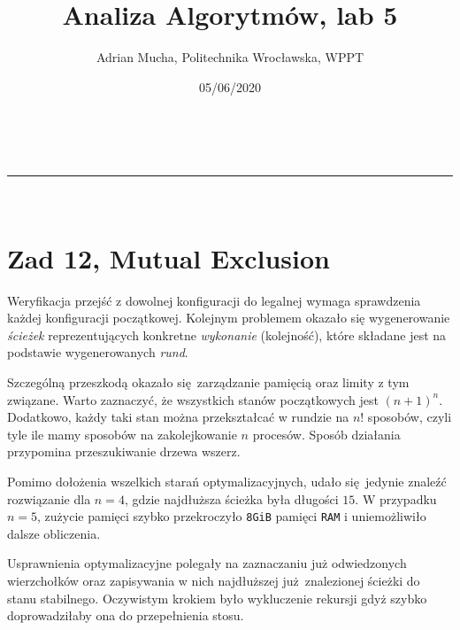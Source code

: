 \documentclass[a4paper,11pt]{article}
\makeatletter
\newcommand{\linia}{\rule{\linewidth}{0.5pt}}
\theoremstyle{mytheor}
\renewcommand{\maketitle}{
\begin{center}
\vspace{2ex}
{\huge \textsc{\@title}}
\vspace{1ex}
\\
\linia\\
\@author \hfill \@date
\vspace{4ex}
\end{center}
}
\makeatother
\begin{document}
\title{Analiza Algorytmów, lab 5}

\author{Adrian Mucha, Politechnika Wrocławska, WPPT}

\date{05/06/2020}

\maketitle

\section*{Zad 12, Mutual Exclusion}
Weryfikacja przejść z dowolnej konfiguracji do legalnej wymaga sprawdzenia każdej konfiguracji początkowej. Kolejnym problemem okazało się wygenerowanie \textit{ścieżek} reprezentujących konkretne \textit{wykonanie} (kolejność), które składane jest na podstawie wygenerowanych \textit{rund}.

Szczególną przeszkodą okazało się zarządzanie pamięcią oraz limity z tym związane. Warto zaznaczyć, że wszystkich stanów początkowych jest $(n+1)^n$. Dodatkowo, każdy taki stan można przekształcać w rundzie na $n!$ sposobów, czyli tyle ile mamy sposobów na zakolejkowanie $n$ procesów. Sposób działania przypomina przeszukiwanie drzewa wszerz.

Pomimo dołożenia wszelkich starań optymalizacyjnych, udało się jedynie znaleźć rozwiązanie dla $n = 4$, gdzie najdłuższa ścieżka była długości $15$. W przypadku $n = 5$, zużycie pamięci szybko przekroczyło \texttt{8GiB} pamięci \texttt{RAM} i uniemożliwiło dalsze obliczenia.

Usprawnienia optymalizacyjne polegały na zaznaczaniu już odwiedzonych wierzchołków oraz zapisywania w nich najdłuższej już znalezionej ścieżki do stanu stabilnego.
Oczywistym krokiem było wykluczenie rekursji gdyż szybko doprowadziłaby ona do przepełnienia stosu.
\end{document}
